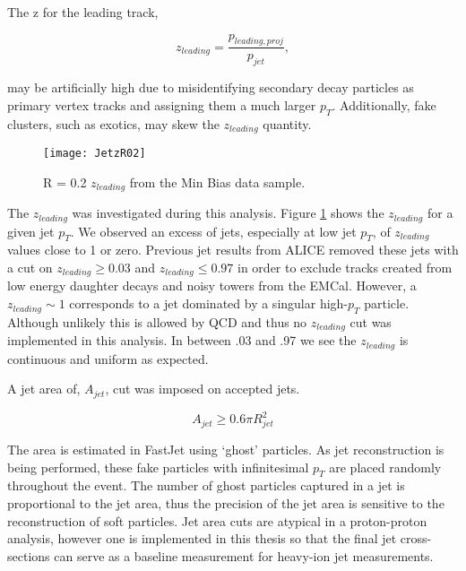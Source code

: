 
The z for the leading track,

\begin{equation}
z_{leading} = \frac{ p_{leading, proj} }{ p_{jet} },
\label{eq:zleading}
\end{equation}

\noindent
may be artificially high due to misidentifying secondary decay particles as primary vertex tracks and assigning them a much larger $p_{T}$.  Additionally, fake clusters, such as exotics, may skew the $z_{leading}$ quantity.  

\begin{figure}[h]
\texttt{[image: JetzR02]}
\centering
\caption{R = 0.2 $z_{leading}$ from the Min Bias data sample.}
\label{fig:Jetz}
\end{figure}

The $z_{leading}$ was investigated during this analysis. Figure \ref{fig:Jetz} shows the $z_{leading}$ for a given jet $p_{T}$.  We observed an excess of jets, especially at low jet $p_{T}$, of $z_{leading}$ values close to 1 or zero.  Previous jet results from ALICE removed these jets with a cut on $ z_{leading} \geq 0.03$ and $z_{leading} \leq 0.97$ in order to exclude tracks created from low energy daughter decays and noisy towers from the EMCal.  However, a $z_{leading} \sim 1$ corresponds to a jet dominated by a singular high-$p_{T}$ particle.  Although unlikely this is allowed by QCD and thus no $z_{leading}$ cut was implemented in this analysis.  In between .03 and .97 we see the $z_{leading}$ is continuous and uniform as expected.  

A jet area of, $A_{jet}$, cut was imposed on accepted jets.

\begin{equation}
A_{jet} \geq 0.6 \pi R_{jet}^{2}
\label{eq:AreaJet}
\end{equation}

\noindent
The area is estimated in FastJet using `ghost' particles.  As jet reconstruction is being performed, these fake particles with infinitesimal $p_{T}$ are placed randomly throughout the event.  The number of ghost particles captured in a jet is proportional to the jet area, thus the precision of the jet area is sensitive to the reconstruction of soft particles.  Jet area cuts are atypical in a proton-proton analysis, however one is implemented in this thesis so that the final jet cross-sections can serve as a baseline measurement for heavy-ion jet measurements.

